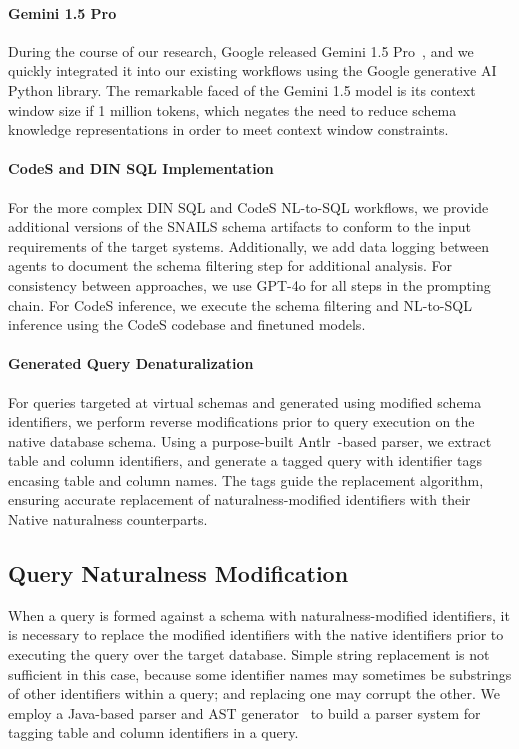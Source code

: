 \paragraph{Gemini 1.5 Pro}
During the course of our research, Google released Gemini 1.5 Pro~\cite{geminiteam2024gemini15}, and we quickly integrated it into our existing workflows using the Google generative AI Python library.
The remarkable faced of the Gemini 1.5 model is its context window size if 1 million tokens, which negates the need to reduce schema knowledge representations in order to meet context window constraints.

\paragraph{\textbf{CodeS and DIN SQL Implementation}}
For the more complex DIN SQL and CodeS NL-to-SQL workflows, we provide additional versions of the SNAILS schema artifacts to conform to the input requirements of the target systems.
Additionally, we add data logging between agents to document the schema filtering step for additional analysis.
For consistency between approaches, we use GPT-4o for all steps in the prompting chain.
For CodeS inference, we execute the schema filtering and NL-to-SQL inference using the CodeS codebase and finetuned models.

\paragraph{\textbf{Generated Query Denaturalization}}
For queries targeted at virtual schemas and generated using modified schema identifiers, we perform reverse modifications prior to query execution on the native database schema.
Using a purpose-built Antlr~\cite{Parr2014}-based parser, we extract table and column identifiers, and generate a tagged query with identifier tags encasing table and column names.
The tags guide the replacement algorithm, ensuring accurate replacement of naturalness-modified identifiers with their Native naturalness counterparts.


\subsection{Query Naturalness Modification}
\label{section:querynaturalnessmodification}

When a query is formed against a schema with naturalness-modified identifiers, it is necessary to replace the modified identifiers with the native identifiers prior to executing the query over the target database.
Simple string replacement is not sufficient in this case, because some identifier names may sometimes be substrings of other identifiers within a query; and replacing one may corrupt the other.
We employ a Java-based parser and AST generator~\cite{Parr2014,antlrgrammarsv4} to build a parser system for tagging table and column identifiers in a query.


